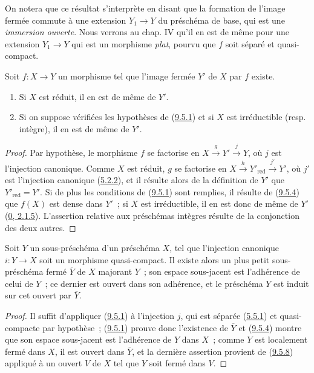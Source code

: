 On notera que ce résultat s'interprète en disant que la formation de l'image
fermée commute à une extension $Y_1\to Y$ du préschéma de base, qui est une
\emph{immersion ouverte}. Nous verrons au chap. IV qu'il en est de même pour
une extension $Y_1\to Y$ qui est un morphisme \emph{plat}, pourvu que $f$
soit séparé et quasi-compact.

\begin{proposition}[9.5.9]
\label{I.9.5.9-fr}
Soit $f:X\to Y$ un morphisme tel que l'image fermée $Y'$ de $X$ par $f$
existe.
\begin{enumerate}
  \item[(i)] Si $X$ est réduit, il en est de même de $Y'$.
  \item[(ii)] Si on suppose vérifiées les hypothèses de
    (\hyperref[I.9.5.1-fr]{9.5.1}) et si $X$ est irréductible (resp.
    intègre), il en est de même de $Y'$.
\end{enumerate}
\end{proposition}

\begin{proof}
Par hypothèse, le morphisme $f$ se factorise en
$X\xrightarrow{g}Y'\xrightarrow{j}Y$, où $j$ est l'injection canonique.
Comme $X$ est réduit, $g$ se factorise en
$X\xrightarrow{h}Y'_{\mathrm{red}}\xrightarrow{j'}Y'$, où $j'$ est
l'injection canonique (\hyperref[I.5.2.2-fr]{5.2.2}), et il résulte alors de
la définition de $Y'$ que $Y'_{\mathrm{red}}=Y'$. Si de plus les conditions
de (\hyperref[I.9.5.1-fr]{9.5.1}) sont remplies, il résulte de
(\hyperref[I.9.5.4-fr]{9.5.4}) que $f(X)$ est dense dans $Y'$~; si $X$ est
irréductible, il en est donc de même de $Y'$
(\hyperref[0.2.1.5-fr]{0, 2.1.5}). L'assertion relative aux préschémas
intègres résulte de la conjonction des deux autres.
\end{proof}

\begin{proposition}[9.5.10]
\label{I.9.5.10-fr}
Soit $Y$ un sous-préschéma d'un préschéma $X$, tel que l'injection canonique
$i:Y\to X$ soit un morphisme quasi-compact. Il existe alors un plus petit
sous-préschéma fermé $\overline{Y}$ de $X$ majorant $Y$~; son espace
sous-jacent est l'adhérence de celui de $Y$~; ce dernier est ouvert dans son
adhérence, et le préschéma $Y$ est induit sur cet ouvert par $\overline{Y}$.
\end{proposition}

\begin{proof}
Il suffit d'appliquer (\hyperref[I.9.5.1-fr]{9.5.1}) à l'injection $j$, qui
est séparée (\hyperref[I.5.5.1-fr]{5.5.1}) et quasi-compacte par hypothèse~;
(\hyperref[I.9.5.1-fr]{9.5.1}) prouve donc l'existence de $\overline{Y}$ et
(\hyperref[I.9.5.4-fr]{9.5.4}) montre que son espace sous-jacent est
l'adhérence de $Y$ dans $X$~; comme $Y$ est localement fermé dans $X$, il
est ouvert dans $\overline{Y}$, et la dernière assertion provient de
(\hyperref[I.9.5.8-fr]{9.5.8}) appliqué à un ouvert $V$ de $X$ tel que $Y$
soit fermé dans $V$.
\end{proof}

